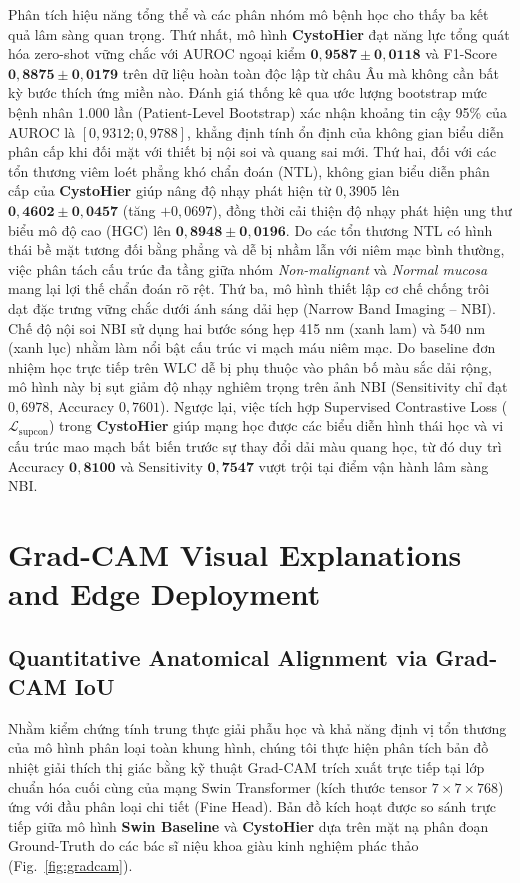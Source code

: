 \documentclass[runningheads]{llncs}
\begin{document}
Phân tích hiệu năng tổng thể và các phân nhóm mô bệnh học cho thấy ba kết quả lâm sàng quan trọng. Thứ nhất, mô hình \textbf{CystoHier} đạt năng lực tổng quát hóa zero-shot vững chắc với AUROC ngoại kiểm $\mathbf{0{,}9587 \pm 0{,}0118}$ và F1-Score $\mathbf{0{,}8875 \pm 0{,}0179}$ trên dữ liệu hoàn toàn độc lập từ châu Âu mà không cần bất kỳ bước thích ứng miền nào. Đánh giá thống kê qua ước lượng bootstrap mức bệnh nhân 1.000 lần (Patient-Level Bootstrap) xác nhận khoảng tin cậy 95\% của AUROC là $[0{,}9312; 0{,}9788]$, khẳng định tính ổn định của không gian biểu diễn phân cấp khi đối mặt với thiết bị nội soi và quang sai mới. Thứ hai, đối với các tổn thương viêm loét phẳng khó chẩn đoán (NTL), không gian biểu diễn phân cấp của \textbf{CystoHier} giúp nâng độ nhạy phát hiện từ $0{,}3905$ lên $\mathbf{0{,}4602 \pm 0{,}0457}$ (tăng $+0{,}0697$), đồng thời cải thiện độ nhạy phát hiện ung thư biểu mô độ cao (HGC) lên $\mathbf{0{,}8948 \pm 0{,}0196}$. Do các tổn thương NTL có hình thái bề mặt tương đối bằng phẳng và dễ bị nhầm lẫn với niêm mạc bình thường, việc phân tách cấu trúc đa tầng giữa nhóm \textit{Non-malignant} và \textit{Normal mucosa} mang lại lợi thế chẩn đoán rõ rệt. Thứ ba, mô hình thiết lập cơ chế chống trôi dạt đặc trưng vững chắc dưới ánh sáng dải hẹp (Narrow Band Imaging -- NBI). Chế độ nội soi NBI sử dụng hai bước sóng hẹp 415 nm (xanh lam) và 540 nm (xanh lục) nhằm làm nổi bật cấu trúc vi mạch máu niêm mạc. Do baseline đơn nhiệm học trực tiếp trên WLC dễ bị phụ thuộc vào phân bố màu sắc dải rộng, mô hình này bị sụt giảm độ nhạy nghiêm trọng trên ảnh NBI (Sensitivity chỉ đạt $0{,}6978$, Accuracy $0{,}7601$). Ngược lại, việc tích hợp Supervised Contrastive Loss ($\mathcal{L}_{\text{supcon}}$) trong \textbf{CystoHier} giúp mạng học được các biểu diễn hình thái học và vi cấu trúc mao mạch bất biến trước sự thay đổi dải màu quang học, từ đó duy trì Accuracy $\mathbf{0{,}8100}$ và Sensitivity $\mathbf{0{,}7547}$ vượt trội tại điểm vận hành lâm sàng NBI.

\FloatBarrier
\section{Grad-CAM Visual Explanations and Edge Deployment}
\label{sec:explainability}

\subsection{Quantitative Anatomical Alignment via Grad-CAM IoU}
Nhằm kiểm chứng tính trung thực giải phẫu học và khả năng định vị tổn thương của mô hình phân loại toàn khung hình, chúng tôi thực hiện phân tích bản đồ nhiệt giải thích thị giác bằng kỹ thuật Grad-CAM \cite{ref_selvaraju2017gradcam} trích xuất trực tiếp tại lớp chuẩn hóa cuối cùng của mạng Swin Transformer (kích thước tensor $7 \times 7 \times 768$) ứng với đầu phân loại chi tiết (Fine Head). Bản đồ kích hoạt được so sánh trực tiếp giữa mô hình \textbf{Swin Baseline} và \textbf{CystoHier} dựa trên mặt nạ phân đoạn Ground-Truth do các bác sĩ niệu khoa giàu kinh nghiệm phác thảo (Fig.~\ref{fig:gradcam}).
\end{document}
